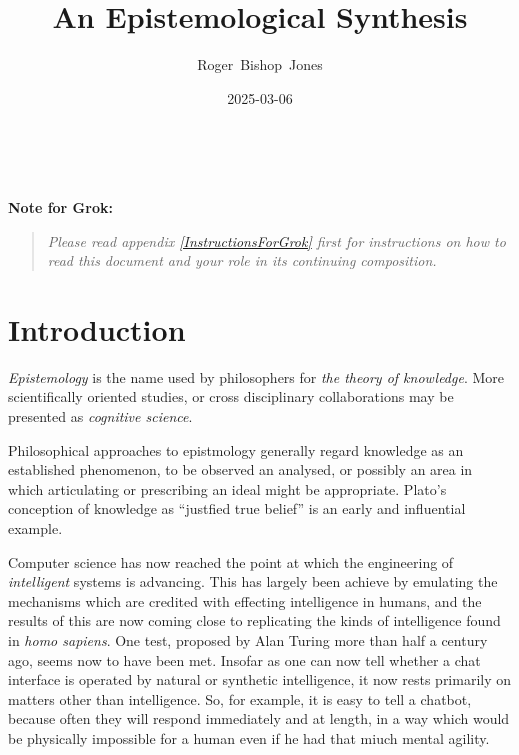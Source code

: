 \documentclass[10pt,titlepage]{book}
\title{\bf\LARGE An Epistemological Synthesis}
\author{Roger~Bishop~Jones}
\date{\small 2025-03-06}
\newcommand{\ignore}[1]{}
\newcommand{\groknote}[1]{\vfil
  {\bf Note for Grok:}
    \begin{quote}
      {\it #1}
    \end{quote}
    \vfil
  }
\begin{document}

%
                               
\begin{titlepage}
\maketitle





\end{titlepage}

\ \

\ignore{
\begin{centering}
{}
\end{centering}
}%

\setcounter{tocdepth}{2}
{\parskip-0pt\tableofcontents}



\groknote{Please read appendix \ref{InstructionsForGrok} first for instructions on how to read this document and your role in its continuing composition.}

\chapter{Introduction}

\emph{Epistemology} is the name used by philosophers for \emph{the theory of knowledge}.
More scientifically oriented studies, or cross disciplinary collaborations may be presented as \emph{cognitive science}.

Philosophical approaches to epistmology generally regard knowledge as an established phenomenon, to be observed an analysed, or possibly an area in which articulating or prescribing an ideal might be appropriate.
Plato's conception of knowledge as ``justfied true belief'' is an early and influential example.

Computer science has now reached the point at which the engineering of \emph{intelligent} systems is advancing.
This has largely been achieve by emulating the mechanisms which are credited with effecting intelligence in humans, and the results of this are now coming close to replicating the kinds of intelligence found in \emph{homo sapiens}.
One test, proposed by Alan Turing more than half a century ago, seems now to have been met.
Insofar as one can now tell whether a chat interface is operated by natural or synthetic intelligence, it now rests primarily on matters other than intelligence.
So, for example, it is easy to tell a chatbot, because often they will respond immediately and at length, in a way which would be physically impossible for a human even if he had that miuch mental agility.
\end{document}
